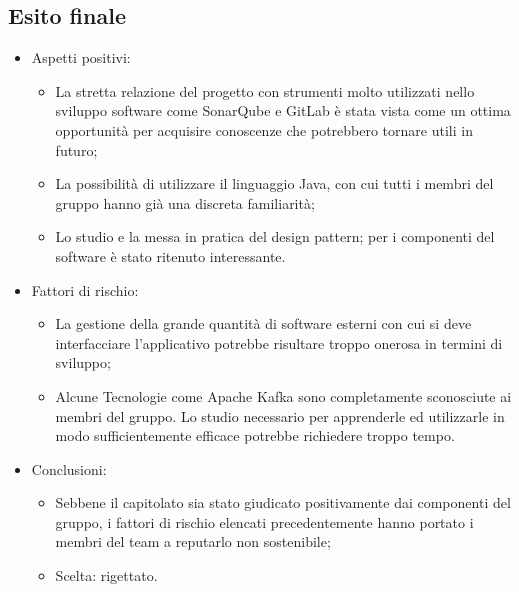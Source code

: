 \subsection{Esito finale}
    \begin{itemize}
        \item Aspetti positivi:
        \begin{itemize}
        \item La stretta relazione del progetto con strumenti molto utilizzati nello sviluppo software come SonarQube e GitLab è stata vista come un ottima opportunità per acquisire conoscenze che potrebbero tornare utili in futuro;
        \item La possibilità di utilizzare il linguaggio Java, con cui tutti i membri del gruppo hanno già una discreta familiarità;
        \item Lo studio e la messa in pratica del design pattern;  per i componenti del software è stato ritenuto interessante.
        \end{itemize}
        \item Fattori di rischio:
        \begin{itemize}
        \item La gestione della grande quantità di software esterni con cui si deve interfacciare l'applicativo potrebbe risultare troppo onerosa in termini di sviluppo;
        \item Alcune Tecnologie come Apache Kafka sono completamente sconosciute ai membri del gruppo. Lo studio necessario per apprenderle ed utilizzarle in modo sufficientemente efficace potrebbe richiedere troppo tempo.
        \end{itemize}
        \item Conclusioni:
        \begin{itemize}
        \item Sebbene il capitolato sia stato giudicato positivamente dai componenti del gruppo, i fattori di rischio elencati precedentemente hanno portato i membri del team a reputarlo non sostenibile;
        \item Scelta: rigettato.
        \end{itemize}
        
    \end{itemize}
